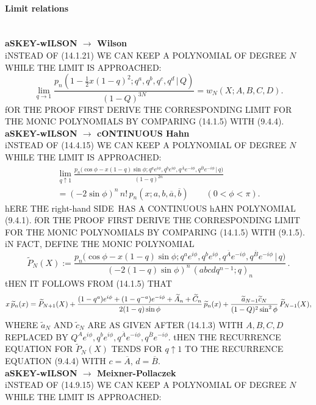 \documentclass[twoside,11pt]{article}
\newcommand\sa{\smallskipamount}
\newcommand\sLP{\\[\sa]}
\newcommand\ba{\bigskipamount}
\newcommand\bLP{\\[\ba]}
\newcommand\thalf{\tfrac12}
\newcommand\wt{\widetilde}
\newcommand\RHS{right-hand SIDE}
\begin{document}
\paragraph{Limit relations}\quad\sLP 
{\bf aSKEY-wILSON $\longrightarrow$ Wilson}\\ 
iNSTEAD OF (14.1.21) WE CAN KEEP A POLYNOMIAL OF DEGREE $N$ WHILE THE LIMIT IS APPROACHED: 
\begin{equation} 
\lim_{q\to1}\frac{p_n(1-\thalf x(1-q)^2;q^a,q^b,q^c,q^d\,|\, Q)}{(1-Q)^{3N}} 
=w_N(X;A,B,C,D). 
\label{109} 
\end{equation} 
fOR THE PROOF FIRST DERIVE THE CORRESPONDING LIMIT FOR THE MONIC POLYNOMIALS BY COMPARING 
(14.1.5) WITH (9.4.4). 
\bLP 
{\bf aSKEY-wILSON $\longrightarrow$ cONTINUOUS Hahn}\\ 
iNSTEAD OF (14.4.15) WE CAN KEEP A POLYNOMIAL OF DEGREE $N$ WHILE THE LIMIT IS APPROACHED: 
\begin{multline} 
\lim_{q\uparrow1} 
\frac{p_n\big(\cos\phi-x(1-q)\sin\phi;q^a e^{i\phi},q^b e^{i\phi},q^{\overline A} e^{-i\phi}, 
q^{\overline B} e^{-i\phi}\,|\, q\big)} 
{(1-q)^{2n}}\\ 
=(-2\sin\phi)^n\,n!\,p_n(x;a,b,\overline a,\overline b)\qquad 
(0<\phi<\pi). 
\label{177} 
\end{multline} 
hERE THE \RHS\ HAS A CONTINUOUS hAHN POLYNOMIAL (9.4.1). 
fOR THE PROOF FIRST DERIVE THE CORRESPONDING LIMIT FOR THE MONIC POLYNOMIALS BY COMPARING 
(14.1.5) WITH (9.1.5). 
iN FACT, DEFINE THE MONIC POLYNOMIAL 
\[ 
\wt P_N(X):= 
\frac{p_n\big(\cos\phi-x(1-q)\sin\phi;q^a e^{i\phi},q^b e^{i\phi},q^{\overline A} e^{-i\phi}, 
q^{\overline B} e^{-i\phi}\,|\, q\big)} 
{(-2(1-q)\sin\phi)^n\,(abcdq^{n-1};q)_n}\,. 
\] 
tHEN IT FOLLOWS FROM (14.1.5) THAT 
\begin{equation*} 
x\,\wt p_n(x)=\wt P_{N+1}(X) 
+\frac{(1-q^a)e^{i\phi}+(1-q^{-a})e^{-i\phi}+\wt A_n+\wt C_n}{2(1-q)\sin\phi}\,\wt p_n(x)\\ 
+\frac{\wt a_{N-1} \wt c_N}{(1-Q)^2 \sin^2\phi}\,\wt P_{N-1}(X), 
\end{equation*} 
WHERE $\wt a_N$ AND $\wt c_N$ ARE AS GIVEN AFTER (14.1.3) WITH $A,B,C,D$ REPLACED BY 
$Q^A e^{i\phi},q^b e^{i\phi},q^{\overline A} e^{-i\phi},q^{\overline B} e^{-i\phi}$. 
tHEN THE RECURRENCE EQUATION FOR $\wt P_N(X)$ TENDS FOR $q\uparrow 1$ TO 
THE RECURRENCE EQUATION (9.4.4) WITH $c=\overline A$, $d=\overline B$. 
\bLP 
{\bf aSKEY-wILSON $\longrightarrow$ Meixner-Pollaczek}\\ 
iNSTEAD OF (14.9.15) WE CAN KEEP A POLYNOMIAL OF DEGREE $N$ WHILE THE LIMIT IS APPROACHED: 
\end{document}
